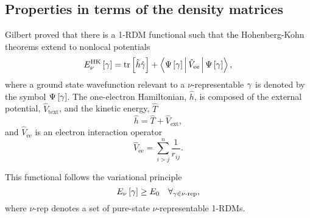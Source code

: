 \subsection{Properties in terms of the density matrices} %
\label{sub:Properties in terms of the density matrices}

Gilbert proved that there is a 1-RDM functional
such that the Hohenberg-Kohn theorems extend to 
nonlocal potentials
\begin{equation} \label{ec:HK-functional}
    \func{E_{\nu}^{\text{HK}}}{\fordm} = 
    \mytrace{\hat{h} \hat{\fordm}} + 
    \Braket{\func{\Psi}{\fordm} | \hat{V}_{\text{ee}} | \func{\Psi}{\fordm}}
    ,
\end{equation}
where a ground state wavefunction relevant to a $\nu$-representable $\gamma$ 
is denoted by the symbol $\Psi \left[ \gamma \right]$.
The one-electron Hamiltonian, $\hat{h}$, is composed of the external
potential, $\hat{V}_{\text{text}}$, and the kinetic energy, $\hat{T}$
\begin{equation}
    \hat{h} = \hat{T} + \hat{V}_{\text{ext}}
        ,
\end{equation}
and $\hat{V}_{\text{ee}}$ is an electron interaction operator 
\begin{equation}
    \hat{V}_{\text{ee}} = 
    \sum_{i>j}^{n} \frac{1}{r_{ij}}
    .
\end{equation}

This functional follows the variational principle 
\begin{equation} \label{ec:var-princ-nu-rep}
    E_{\nu} \left[ \gamma \right] \ge E_0 \quad \forall_{\gamma \in \text{$\nu$-rep}}
    ,
\end{equation}
where $\nu$-rep denotes a set of pure-state $\nu$-representable 1-RDMs.

